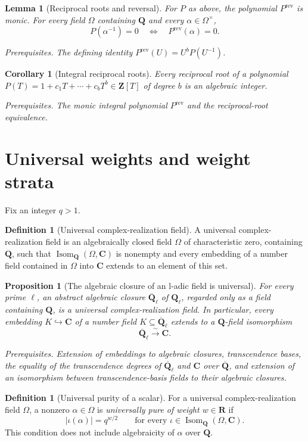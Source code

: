 \documentclass[10pt]{article}
\newtheorem{proposition}[theorem]{Proposition}
\newtheorem{corollary}[theorem]{Corollary}
\newtheorem{lemma}[theorem]{Lemma}
\theoremstyle{definition}
\newtheorem{definition}[theorem]{Definition}
\newcommand{\Ql}{\mathbf Q_\ell}
\newcommand{\Qlb}{\overline{\mathbf Q}_\ell}
\newcommand{\Qbar}{\overline{\mathbf Q}}
\newcommand{\deps}[1]{\par\smallskip\noindent\textit{Prerequisites.} #1}
\begin{document}
\begin{lemma}[Reciprocal roots and reversal]
For \(P\) as above, the polynomial \(P^{\mathrm{rev}}\) is monic.  For every
field \(\Omega\) containing \(\mathbf Q\) and every
\(\alpha\in\Omega^\times\),
\[
 P(\alpha^{-1})=0
 \quad\Longleftrightarrow\quad
 P^{\mathrm{rev}}(\alpha)=0.
\]
\deps{The defining identity \(P^{\mathrm{rev}}(U)=U^bP(U^{-1})\).}
\end{lemma}

\begin{corollary}[Integral reciprocal roots]
Every reciprocal root of a polynomial
\(P(T)=1+c_1T+\cdots+c_bT^b\in\mathbf Z[T]\) of degree \(b\) is an
algebraic integer.
\deps{The monic integral polynomial \(P^{\mathrm{rev}}\) and the
reciprocal-root equivalence.}
\end{corollary}

\section{Universal weights and weight strata}

Fix an integer \(q>1\).

\begin{definition}[Universal complex-realization field]
A universal complex-realization field is an algebraically closed field
\(\Omega\) of characteristic zero, containing \(\mathbf Q\), such that
\(\operatorname{Isom}_{\mathbf Q}(\Omega,\mathbf C)\) is nonempty and every
embedding of a number field contained in \(\Omega\) into \(\mathbf C\)
extends to an element of this set.
\end{definition}

\begin{proposition}[The algebraic closure of an l-adic field is universal]
For every prime \(\ell\), an abstract algebraic closure \(\Qlb\) of
\(\Ql\), regarded only as a field containing \(\mathbf Q\), is a universal
complex-realization field.  In particular, every embedding
\(K\hookrightarrow\mathbf C\) of a number field
\(K\subseteq\Qlb\) extends to a \(\mathbf Q\)-field isomorphism
\[
 \Qlb\xrightarrow{\sim}\mathbf C.
\]
\deps{Extension of embeddings to algebraic closures, transcendence bases,
the equality of the transcendence degrees of \(\Qlb\) and \(\mathbf C\)
over \(\Qbar\), and extension of an isomorphism between transcendence-basis
fields to their algebraic closures.}
\end{proposition}

\begin{definition}[Universal purity of a scalar]
For a universal complex-realization field \(\Omega\), a nonzero
\(\alpha\in\Omega\) is \emph{universally pure of weight \(w\in\mathbf R\)}
if
\[
 |\iota(\alpha)|=q^{w/2}
 \qquad
 \text{for every }\iota\in
 \operatorname{Isom}_{\mathbf Q}(\Omega,\mathbf C).
\]
This condition does not include algebraicity of \(\alpha\) over
\(\mathbf Q\).
\end{definition}
\end{document}
